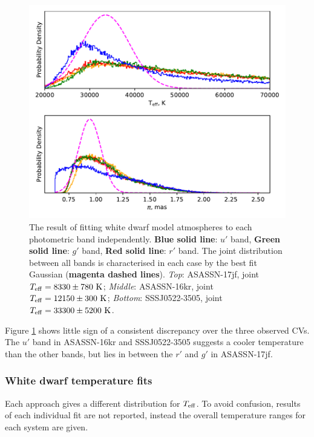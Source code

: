 \begin{figure}
    \includegraphics[width=\columnwidth, trim={0cm 6.5cm 0cm 0cm}, clip]{figures/results/three_cvs_with_weird_colours/SSS111126/PhysicalParams/all_gamma_SSS111126.pdf}
    \caption{The result of fitting white dwarf model atmospheres to each photometric band independently. {\bf Blue solid line}: $u'$ band, {\bf Green solid line}: $g'$ band, {\bf Red solid line}: $r'$ band. The joint distribution between all bands is characterised in each case by the best fit Gaussian ({\bf magenta dashed lines}). \textit{Top}: ASASSN-17jf, joint $T_{\rm eff}=8330\pm780\rm\ K$; \textit{Middle}: ASASSN-16kr, joint $T_{\rm eff}=12150\pm300\rm\ K$; \textit{Bottom}: SSSJ0522-3505, joint $T_{\rm eff}=33300\pm5200 \rm\ K$. }
    \label{fig:three white dwarfs:gamma fits}
\end{figure}

Figure \ref{fig:three white dwarfs:gamma fits} shows little sign of a consistent discrepancy over the three observed CVs. The $u'$ band in ASASSN-16kr and SSSJ0522-3505 suggests a cooler temperature than the other bands, but lies in between the $r'$ and $g'$ in ASASSN-17jf.


\subsubsection{White dwarf temperature fits}
\label{sect:white dwarf temperature report}

Each approach gives a different distribution for $T_{\rm eff}$.
To avoid confusion, results of each individual fit are not reported, instead the overall temperature ranges for each system are given.

